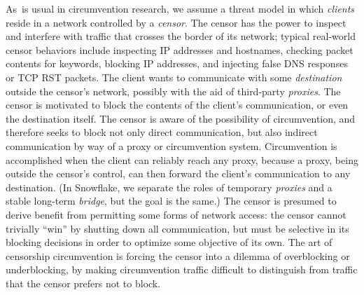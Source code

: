 \documentclass[letterpaper,twocolumn]{article}
\newcommand{\firstterm}[1]{\textit{#1}}
\begin{document}
As~is usual in circumvention research,
we assume a threat model in which
\firstterm{clients} reside in a network
controlled by a \firstterm{censor}.
The censor has the power to inspect and interfere with
traffic that crosses the border of its network;
typical real-world censor behaviors include
inspecting IP addresses and hostnames,
checking packet contents for keywords,
blocking IP addresses, and injecting false DNS responses
or TCP RST packets.
The client wants to communicate with some
\firstterm{destination} outside the censor's network,
possibly with the aid of third-party \firstterm{proxies}.
The censor is motivated to block the contents
of the client's communication, or even the destination itself.
The censor is aware of the possibility of circumvention,
and therefore seeks to block not only direct communication,
but also indirect communication by way of a proxy or circumvention system.
Circumvention is accomplished when the client
can reliably reach any proxy,
because a proxy, being outside the censor's control,
can then forward the client's communication to any destination.
(In Snowflake, we separate the roles of temporary \firstterm{proxies}
and a stable long-term \firstterm{bridge}, but the goal is the same.)
The censor is presumed to derive benefit
from permitting some forms of network access:
the censor cannot trivially ``win''
by shutting down all communication,
but must be selective in its blocking decisions
in order to optimize some objective of its own.
The art of censorship circumvention is
forcing the censor into a dilemma
of overblocking or underblocking,
by making circumvention traffic difficult to distinguish
from traffic that the censor prefers not to block.
\end{document}
